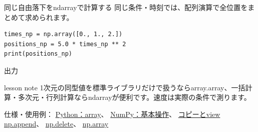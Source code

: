 \documentclass[12pt,aspectratio=43]{beamer}
\newcommand{\code}[1]{{\codefont #1}}
\newcommand{\out}[1]{%
  \par\vspace{.5mm}\noindent
  {\small\textcolor{black!60}{出力}}\hspace{1mm}%
  \begin{minipage}[t]{.88\linewidth}\vspace{0pt}%
    {\codefont\fontsize{11}{12.5}\selectfont #1}%
  \end{minipage}\par}
\newenvironment{lessonbox}
  {\begin{beamercolorbox}[wd=\linewidth,sep=1.5mm]{lesson note}}
  {\end{beamercolorbox}\par}
\begin{document}
\begin{frame}[t,fragile]{同じ自由落下を\code{ndarray}で計算する}
  \small 同じ条件・時刻では、配列演算で全位置をまとめて求められます。
\begin{lstlisting}
times_np = np.array([0., 1., 2.])
positions_np = 5.0 * times_np ** 2
print(positions_np)
\end{lstlisting}
  \out{[ 0.  5. 20.]}
  \begin{lessonbox}
    1次元の同型値を標準ライブラリだけで扱うなら\code{array.array}、一括計算・多次元・行列計算なら\code{ndarray}が便利です。速度は実際の条件で測ります。
  \end{lessonbox}
  \vfill
  {\fontsize{8}{10}\selectfont
    仕様・使用例：
    \href{https://docs.python.org/3/library/array.html}{Python：array}、
    \href{https://numpy.org/doc/stable/user/quickstart.html}{NumPy：基本操作}、
    \href{https://numpy.org/doc/stable/user/basics.copies.html}{コピーとview}\\
    \href{https://numpy.org/doc/stable/reference/generated/numpy.append.html}{np.append}、
    \href{https://numpy.org/doc/stable/reference/generated/numpy.delete.html}{np.delete}、
    \href{https://numpy.org/doc/stable/reference/generated/numpy.array.html}{np.array}}
\end{frame}
\end{document}
